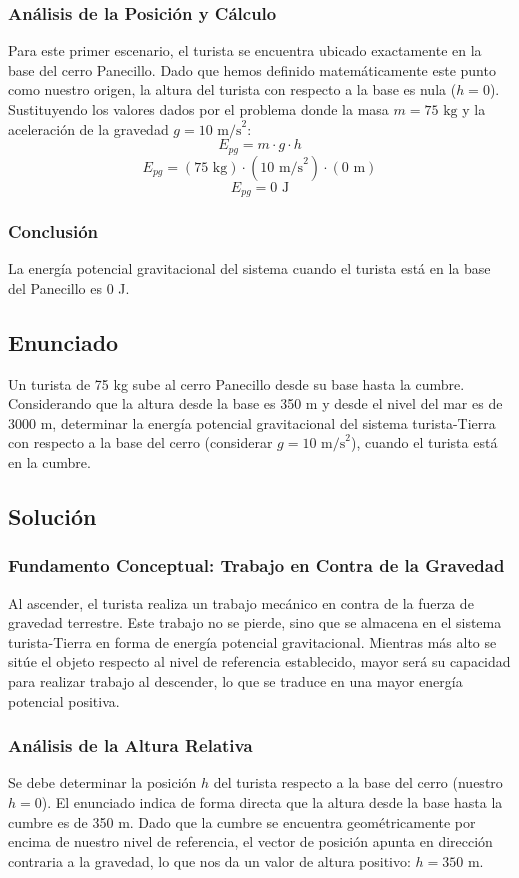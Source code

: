\documentclass[12pt,a4paper]{article}
\begin{document}
\subsubsection*{Análisis de la Posición y Cálculo}
Para este primer escenario, el turista se encuentra ubicado exactamente en la base del cerro Panecillo. Dado que hemos definido matemáticamente este punto como nuestro origen, la altura del turista con respecto a la base es nula ($h = 0$).
Sustituyendo los valores dados por el problema donde la masa $m = 75 \text{ kg}$ y la aceleración de la gravedad $g = 10 \text{ m/s}^2$:
$$E_{pg} = m \cdot g \cdot h$$
$$E_{pg} = (75 \text{ kg}) \cdot (10 \text{ m/s}^2) \cdot (0 \text{ m})$$
$$E_{pg} = 0 \text{ J}$$

\subsubsection*{Conclusión}
La energía potencial gravitacional del sistema cuando el turista está en la base del Panecillo es 0 J.

\newpage
\subsection*{Enunciado}
Un turista de 75 kg sube al cerro Panecillo desde su base hasta la cumbre. Considerando que la altura desde la base es 350 m y desde el nivel del mar es de 3000 m, determinar la energía potencial gravitacional del sistema turista-Tierra con respecto a la base del cerro (considerar $g = 10 \text{ m/s}^2$), cuando el turista está en la cumbre.

\subsection*{Solución}

\subsubsection*{Fundamento Conceptual: Trabajo en Contra de la Gravedad}
Al ascender, el turista realiza un trabajo mecánico en contra de la fuerza de gravedad terrestre. Este trabajo no se pierde, sino que se almacena en el sistema turista-Tierra en forma de energía potencial gravitacional. Mientras más alto se sitúe el objeto respecto al nivel de referencia establecido, mayor será su capacidad para realizar trabajo al descender, lo que se traduce en una mayor energía potencial positiva.

\subsubsection*{Análisis de la Altura Relativa}
Se debe determinar la posición $h$ del turista respecto a la base del cerro (nuestro $h=0$). El enunciado indica de forma directa que la altura desde la base hasta la cumbre es de 350 m. Dado que la cumbre se encuentra geométricamente por encima de nuestro nivel de referencia, el vector de posición apunta en dirección contraria a la gravedad, lo que nos da un valor de altura positivo: $h = 350 \text{ m}$.
\end{document}
